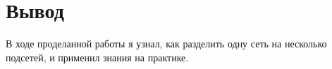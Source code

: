 \chapter{Вывод}
\label{ch:chap3}

В ходе проделанной работы я узнал, как разделить одну сеть на несколько подсетей, и применил знания на практике.
\endinput